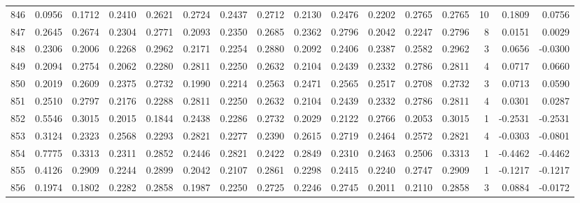\begin{tabular}{lrrrrrrrrrrrrrrr}
846 &      0.0956 &  0.1712 &  0.2410 &  0.2621 &  0.2724 &  0.2437 &  0.2712 &  0.2130 &  0.2476 &  0.2202 &   0.2765 &     0.2765 &     10 &                    0.1809 &                     0.0756 \\
847 &      0.2645 &  0.2674 &  0.2304 &  0.2771 &  0.2093 &  0.2350 &  0.2685 &  0.2362 &  0.2796 &  0.2042 &   0.2247 &     0.2796 &      8 &                    0.0151 &                     0.0029 \\
848 &      0.2306 &  0.2006 &  0.2268 &  0.2962 &  0.2171 &  0.2254 &  0.2880 &  0.2092 &  0.2406 &  0.2387 &   0.2582 &     0.2962 &      3 &                    0.0656 &                    -0.0300 \\
849 &      0.2094 &  0.2754 &  0.2062 &  0.2280 &  0.2811 &  0.2250 &  0.2632 &  0.2104 &  0.2439 &  0.2332 &   0.2786 &     0.2811 &      4 &                    0.0717 &                     0.0660 \\
850 &      0.2019 &  0.2609 &  0.2375 &  0.2732 &  0.1990 &  0.2214 &  0.2563 &  0.2471 &  0.2565 &  0.2517 &   0.2708 &     0.2732 &      3 &                    0.0713 &                     0.0590 \\
851 &      0.2510 &  0.2797 &  0.2176 &  0.2288 &  0.2811 &  0.2250 &  0.2632 &  0.2104 &  0.2439 &  0.2332 &   0.2786 &     0.2811 &      4 &                    0.0301 &                     0.0287 \\
852 &      0.5546 &  0.3015 &  0.2015 &  0.1844 &  0.2438 &  0.2286 &  0.2732 &  0.2029 &  0.2122 &  0.2766 &   0.2053 &     0.3015 &      1 &                   -0.2531 &                    -0.2531 \\
853 &      0.3124 &  0.2323 &  0.2568 &  0.2293 &  0.2821 &  0.2277 &  0.2390 &  0.2615 &  0.2719 &  0.2464 &   0.2572 &     0.2821 &      4 &                   -0.0303 &                    -0.0801 \\
854 &      0.7775 &  0.3313 &  0.2311 &  0.2852 &  0.2446 &  0.2821 &  0.2422 &  0.2849 &  0.2310 &  0.2463 &   0.2506 &     0.3313 &      1 &                   -0.4462 &                    -0.4462 \\
855 &      0.4126 &  0.2909 &  0.2244 &  0.2899 &  0.2042 &  0.2107 &  0.2861 &  0.2298 &  0.2415 &  0.2240 &   0.2747 &     0.2909 &      1 &                   -0.1217 &                    -0.1217 \\
856 &      0.1974 &  0.1802 &  0.2282 &  0.2858 &  0.1987 &  0.2250 &  0.2725 &  0.2246 &  0.2745 &  0.2011 &   0.2110 &     0.2858 &      3 &                    0.0884 &                    -0.0172 \\

\end{tabular}
